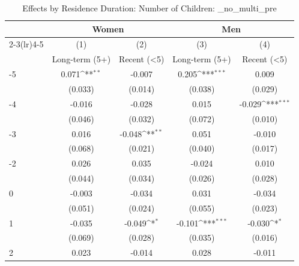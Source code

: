 \begin{table}[htbp]\centering
\def\sym#1{\ifmmode^{#1}\else\(^{#1}\)\fi}
\caption{Effects by Residence Duration: Number of Children: \_no\_multi\_pre}
\begin{tabular}{l*{4}{c}}
\hline\hline
            &\multicolumn{2}{c}{Women}                  &\multicolumn{2}{c}{Men}                    \\\cmidrule(lr){2-3}\cmidrule(lr){4-5}
            &\multicolumn{1}{c}{(1)}&\multicolumn{1}{c}{(2)}&\multicolumn{1}{c}{(3)}&\multicolumn{1}{c}{(4)}\\
            &\multicolumn{1}{c}{Long-term (5+)}&\multicolumn{1}{c}{Recent (<5)}&\multicolumn{1}{c}{Long-term (5+)}&\multicolumn{1}{c}{Recent (<5)}\\
\hline
-5          &       0.071\sym{**} &      -0.007         &       0.205\sym{***}&       0.009         \\
            &     (0.033)         &     (0.014)         &     (0.038)         &     (0.029)         \\
[1em]
-4          &      -0.016         &      -0.028         &       0.015         &      -0.029\sym{***}\\
            &     (0.046)         &     (0.032)         &     (0.072)         &     (0.010)         \\
[1em]
-3          &       0.016         &      -0.048\sym{**} &       0.051         &      -0.010         \\
            &     (0.068)         &     (0.021)         &     (0.040)         &     (0.017)         \\
[1em]
-2          &       0.026         &       0.035         &      -0.024         &       0.010         \\
            &     (0.044)         &     (0.034)         &     (0.026)         &     (0.028)         \\
[1em]
0           &      -0.003         &      -0.034         &       0.031         &      -0.034         \\
            &     (0.051)         &     (0.024)         &     (0.055)         &     (0.023)         \\
[1em]
1           &      -0.035         &      -0.049\sym{*}  &      -0.101\sym{***}&      -0.030\sym{*}  \\
            &     (0.069)         &     (0.028)         &     (0.035)         &     (0.016)         \\
[1em]
2           &       0.023         &      -0.014         &       0.028         &      -0.011         \\

\end{tabular}
\end{table}
